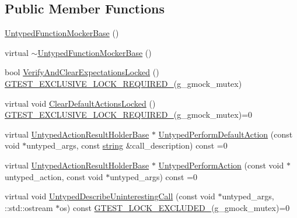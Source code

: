 \subsection*{Public Member Functions}
\begin{DoxyCompactItemize}
\item 
\hyperlink{classtesting_1_1internal_1_1_untyped_function_mocker_base_aedfa95e65d80936e4dff040140513b36}{Untyped\+Function\+Mocker\+Base} ()
\item 
virtual \hyperlink{classtesting_1_1internal_1_1_untyped_function_mocker_base_a6badd47a3fe2a439ef98aa91bf73d721}{$\sim$\+Untyped\+Function\+Mocker\+Base} ()
\item 
bool \hyperlink{classtesting_1_1internal_1_1_untyped_function_mocker_base_a3f1d62a1662a3daa2895b3af963be269}{Verify\+And\+Clear\+Expectations\+Locked} () \hyperlink{gtest-port_8h_a149f693bd59fa1bc937af54c0cdcb32f}{G\+T\+E\+S\+T\+\_\+\+E\+X\+C\+L\+U\+S\+I\+V\+E\+\_\+\+L\+O\+C\+K\+\_\+\+R\+E\+Q\+U\+I\+R\+E\+D\+\_\+}(g\+\_\+gmock\+\_\+mutex)
\item 
virtual void \hyperlink{classtesting_1_1internal_1_1_untyped_function_mocker_base_a40ddd95736946a7951033aa89a7b617f}{Clear\+Default\+Actions\+Locked} () \hyperlink{gtest-port_8h_a149f693bd59fa1bc937af54c0cdcb32f}{G\+T\+E\+S\+T\+\_\+\+E\+X\+C\+L\+U\+S\+I\+V\+E\+\_\+\+L\+O\+C\+K\+\_\+\+R\+E\+Q\+U\+I\+R\+E\+D\+\_\+}(g\+\_\+gmock\+\_\+mutex)=0
\item 
virtual \hyperlink{classtesting_1_1internal_1_1_untyped_action_result_holder_base}{Untyped\+Action\+Result\+Holder\+Base} $\ast$ \hyperlink{classtesting_1_1internal_1_1_untyped_function_mocker_base_a2cb149456cd559d5b0615f2310b235e3}{Untyped\+Perform\+Default\+Action} (const void $\ast$untyped\+\_\+args, const \hyperlink{namespacetesting_1_1internal_a8e8ff5b11e64078831112677156cb111}{string} \&call\+\_\+description) const =0
\item 
virtual \hyperlink{classtesting_1_1internal_1_1_untyped_action_result_holder_base}{Untyped\+Action\+Result\+Holder\+Base} $\ast$ \hyperlink{classtesting_1_1internal_1_1_untyped_function_mocker_base_ada5a72303863d0aa655b66338b8efea5}{Untyped\+Perform\+Action} (const void $\ast$untyped\+\_\+action, const void $\ast$untyped\+\_\+args) const =0
\item 
virtual void \hyperlink{classtesting_1_1internal_1_1_untyped_function_mocker_base_a48a17fa75b744c2bfb19ee1f54d51759}{Untyped\+Describe\+Uninteresting\+Call} (const void $\ast$untyped\+\_\+args, \+::std\+::ostream $\ast$os) const \hyperlink{gtest-port_8h_a69abff5a4efdd07bd5faebe3dd318d06}{G\+T\+E\+S\+T\+\_\+\+L\+O\+C\+K\+\_\+\+E\+X\+C\+L\+U\+D\+E\+D\+\_\+}(g\+\_\+gmock\+\_\+mutex)=0

\end{DoxyCompactItemize}
